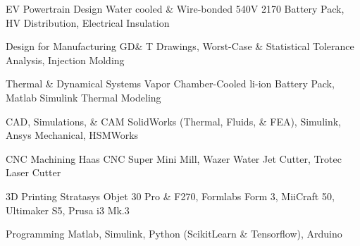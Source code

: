 


\begin{cvskills}





\cvskill
{EV Powertrain Design}
{Water cooled \& Wire-bonded 540V 2170 Battery Pack, HV Distribution, Electrical Insulation}

\cvskill
{Design for Manufacturing}
{GD\& T Drawings, Worst-Case \& Statistical Tolerance Analysis, Injection Molding}

\cvskill
{Thermal \& Dynamical Systems}
{Vapor Chamber-Cooled li-ion Battery Pack, Matlab Simulink Thermal Modeling}

\cvskill
{CAD, Simulations, \& CAM} %
{SolidWorks (Thermal, Fluids, \& FEA), Simulink, Ansys Mechanical, HSMWorks} %

\cvskill
{CNC Machining}
{Haas CNC Super Mini Mill, Wazer Water Jet Cutter, Trotec Laser Cutter}

\cvskill
{3D Printing} %
{Stratasys Objet 30 Pro \& F270, Formlabs Form 3, MiiCraft 50, Ultimaker S5, Prusa i3 Mk.3} %

\cvskill
{Programming} %
{Matlab, Simulink, Python (ScikitLearn \& Tensorflow), Arduino} %



\end{cvskills}
